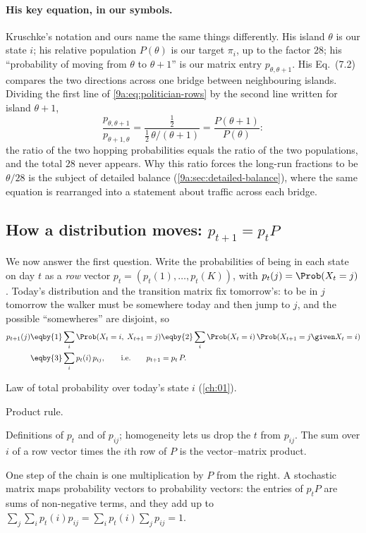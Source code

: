 \paragraph{His key equation, in our symbols.}
Kruschke's notation and ours name the same things differently. His island $\theta$ is our
state $i$; his relative population $P(\theta)$ is our target $\pi_i$, up to the factor $28$;
his ``probability of moving from $\theta$ to $\theta+1$'' is our matrix entry
$p_{\theta,\theta+1}$. His Eq.~(7.2) compares the two directions across one bridge between
neighbouring islands. Dividing the first line of \eqref{9a:eq:politician-rows} by the second
line written for island $\theta+1$,
\begin{equation*}
  \frac{p_{\theta,\theta+1}}{p_{\theta+1,\theta}}
  =\frac{\tfrac12}{\tfrac12\,\theta/(\theta+1)}
  =\frac{P(\theta+1)}{P(\theta)} :
\end{equation*}
the ratio of the two hopping probabilities equals the ratio of the two populations, and the
total $28$ never appears. Why this ratio forces the long-run fractions to be $\theta/28$ is the
subject of detailed balance (\cref{9a:sec:detailed-balance}), where the same equation is
rearranged into a statement about traffic across each bridge.

\subsection{How a distribution moves: $p_{t+1}=p_tP$}
\label{9a:sec:evolve}

We now answer the first question. Write the probabilities of being in each state on day $t$ as
a \emph{row} vector $p_t=(p_t(1),\dots,p_t(K))$, with $p_t(j)=\Prob(X_t=j)$. Today's
distribution and the transition matrix fix tomorrow's: to be in $j$ tomorrow the walker must be
somewhere today and then jump to $j$, and the possible ``somewheres'' are disjoint, so
\begin{align}
  p_{t+1}(j)
  &\eqby{1}\sum_{i}\Prob(X_t=i,\;X_{t+1}=j)
  \eqby{2}\sum_i\Prob(X_t=i)\,\Prob(X_{t+1}=j\given X_t=i) \nonumber\\
  &\eqby{3}\sum_i p_t(i)\,p_{ij},
  \qquad\text{i.e.}\qquad p_{t+1}=p_t\,P .
  \label{9a:eq:evolve}
\end{align}
\begin{explain}
  \item Law of total probability over today's state $i$ (\cref{ch:01}).
  \item Product rule.
  \item Definitions of $p_t$ and of $p_{ij}$; homogeneity lets us drop the $t$ from $p_{ij}$.
        The sum over $i$ of a row vector times the $i$th row of $P$ is the vector--matrix
        product.
\end{explain}
One step of the chain is one multiplication by $P$ from the right. A stochastic matrix maps
probability vectors to probability vectors: the entries of $p_tP$ are sums of non-negative
terms, and they add up to $\sum_j\sum_ip_t(i)p_{ij}=\sum_ip_t(i)\sum_jp_{ij}=1$.

